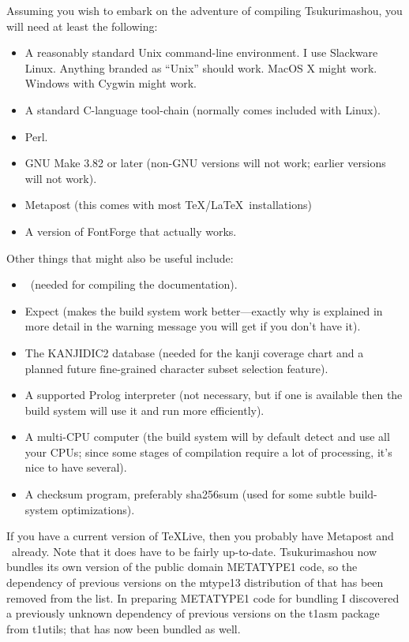 \documentclass[14pt]{extarticle}
\begin{document}
Assuming you wish to embark on the adventure of compiling Tsukurimashou, you
will need at least the following:

\begin{itemize}
  \item A reasonably standard Unix command-line environment.  I use
    Slackware Linux.  Anything branded as ``Unix'' should work.  MacOS X
    might work.  Windows with Cygwin might work.  
  \item A standard C-language tool-chain (normally comes included with Linux).
  \item Perl.
  \item GNU Make 3.82 or later (non-GNU versions will not work;
    earlier versions will not work).
  \item Metapost (this comes with most \TeX/\LaTeX\ installations)
  \item A version of FontForge that actually works.
\end{itemize}

Other things that might also be useful include:

\begin{itemize}
  \item \XeLaTeX\ (needed for compiling the documentation).
  \item Expect (makes the build system work better---exactly why is
    explained in more detail in the warning message
    you will get if you don't have it).
  \item The KANJIDIC2 database (needed for the kanji coverage chart and
    a planned future fine-grained character subset selection feature).
  \item A supported Prolog interpreter (not necessary, but if one is
    available then the build system will use it and run more efficiently).
  \item A multi-CPU computer (the build system will by default detect and
    use all your CPUs; since some stages of compilation require a lot of
    processing, it's nice to have several).
  \item A checksum program, preferably sha256sum (used for some subtle
    build-system optimizations).
\end{itemize}

If you have a current version of \TeX{}Live, then you probably have
Metapost and \XeLaTeX\ already.  Note that it does have to be fairly
up-to-date.  Tsukurimashou now bundles its own version of the public domain
METATYPE1 code, so the dependency of previous versions
on the mtype13 distribution of that has been removed from the list.  In
preparing METATYPE1 code for bundling I discovered a previously unknown
dependency of previous versions on the t1asm package from t1utils; that has
now been bundled as well.
\end{document}
